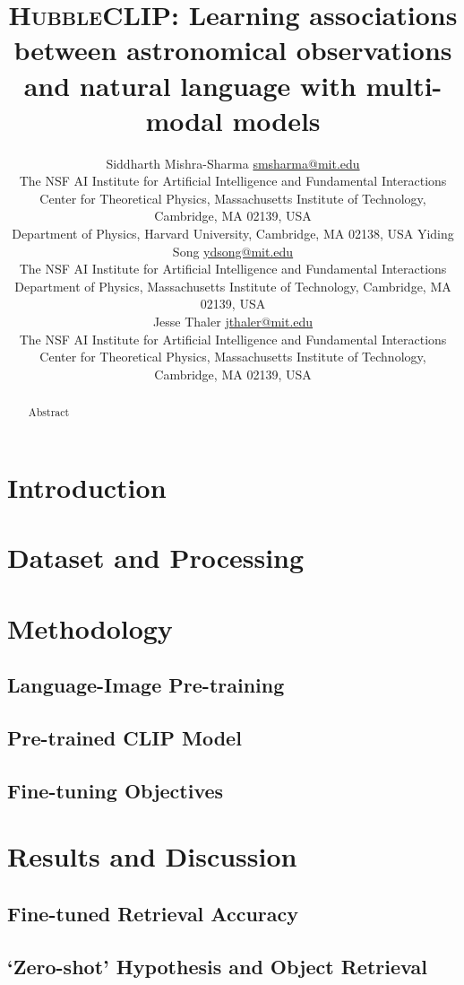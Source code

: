 \documentclass[10pt]{article} %
\title{\textsc{HubbleCLIP}: Learning associations between astronomical observations and natural language with multi-modal models}
\author{\name Siddharth Mishra-Sharma \email \href{mailto:smsharma@mit.edu}{smsharma@mit.edu} \\
      \addr The NSF AI Institute for Artificial Intelligence and Fundamental Interactions\\
      Center for Theoretical Physics, Massachusetts Institute of Technology, Cambridge, MA 02139, USA \\
      Department of Physics, Harvard University, Cambridge, MA 02138, USA
      \AND
      \name Yiding Song \email \href{mailto:ydsong@mit.edu}{ydsong@mit.edu} \\
      \addr The NSF AI Institute for Artificial Intelligence and Fundamental Interactions\\
      Department of Physics, Massachusetts Institute of Technology, Cambridge, MA 02139, USA \\
      \AND
      \name Jesse Thaler \email \href{mailto:jthaler@mit.edu}{jthaler@mit.edu} \\
      \addr The NSF AI Institute for Artificial Intelligence and Fundamental Interactions\\
      Center for Theoretical Physics, Massachusetts Institute of Technology, Cambridge, MA 02139, USA \\
}
\begin{document}
\maketitle

\begin{abstract}
Abstract
\end{abstract}

\section{Introduction}
\label{sec:intro}

\section{Dataset and Processing}
\label{sec:dataset}

\section{Methodology}
\label{sec:methodology}

\subsection{Language-Image Pre-training}
\label{sec:pretraining}

\subsection{Pre-trained CLIP Model}
\label{sec:clip}

\subsection{Fine-tuning Objectives}
\label{sec:finetuning}

\section{Results and Discussion}
\label{sec:results}

\subsection{Fine-tuned Retrieval Accuracy}
\label{sec:retrieval_acc}

\subsection{`Zero-shot' Hypothesis and Object Retrieval}
\label{sec:zero_shot}
\end{document}
